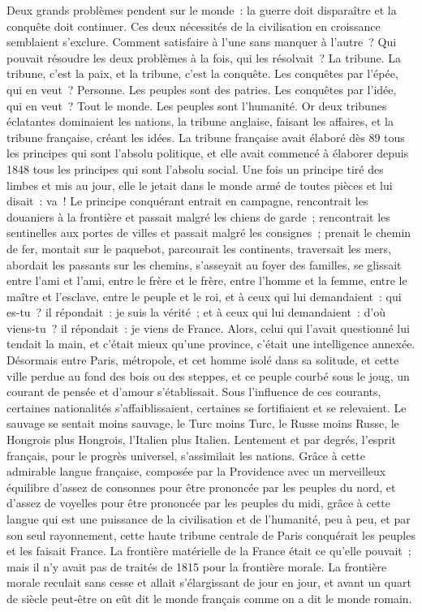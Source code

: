 \documentclass[french,twoside]{book} %
\begin{document}
\noindent Deux grands problèmes pendent sur le monde : la guerre doit disparaître et la conquête doit continuer. Ces deux nécessités de la civilisation en croissance semblaient s’exclure. Comment satisfaire à l’une sans manquer à l’autre ? Qui pouvait résoudre les deux problèmes à la fois, qui les résolvait ? La tribune. La tribune, c’est la paix, et la tribune, c’est la conquête. Les conquêtes par l’épée, qui en veut ? Personne. Les peuples sont des patries. Les conquêtes par l’idée, qui en veut ? Tout le monde. Les peuples sont l’humanité. Or deux tribunes éclatantes dominaient les nations, la tribune anglaise, faisant les affaires, et la tribune française, créant les idées. La tribune française avait élaboré dès 89 tous les principes qui sont l’absolu politique, et elle avait commencé à élaborer depuis 1848 tous les principes qui sont l’absolu social. Une fois un principe tiré des limbes et mis au jour, elle le jetait dans le monde armé de toutes pièces et lui disait : va ! Le principe conquérant entrait en campagne, rencontrait les douaniers à la frontière et passait malgré les chiens de garde ; rencontrait les sentinelles aux portes de villes et passait malgré les consignes ; prenait le chemin de fer, montait sur le paquebot, parcourait les continents, traversait les mers, abordait les passants sur les chemins, s’asseyait au foyer des familles, se glissait entre l’ami et l’ami, entre le frère et le frère, entre l’homme et la femme, entre le maître et l’esclave, entre le peuple et le roi, et à ceux qui lui demandaient : qui es-tu ? il répondait : je suis la vérité ; et à ceux qui lui demandaient : d’où viens-tu ? il répondait : je viens de France. Alors, celui qui l’avait questionné lui tendait la main, et c’était mieux qu’une province, c’était une intelligence annexée. Désormais entre Paris, métropole, et cet homme isolé dans sa solitude, et cette ville perdue au fond des bois ou des steppes, et ce peuple courbé sous le joug, un courant de pensée et d’amour s’établissait. Sous l’influence de ces courants, certaines nationalités s’affaiblissaient, certaines se fortifiaient et se relevaient. Le sauvage se sentait moins sauvage, le Turc moins Turc, le Russe moins Russe, le Hongrois plus Hongrois, l’Italien plus Italien. Lentement et par degrés, l’esprit français, pour le progrès universel, s’assimilait les nations. Grâce à cette admirable langue française, composée par la Providence avec un merveilleux équilibre d’assez de consonnes pour être prononcée par les peuples du nord, et d’assez de voyelles pour être prononcée par les peuples du midi, grâce à cette langue qui est une puissance de la civilisation et de l’humanité, peu à peu, et par son seul rayonnement, cette haute tribune centrale de Paris conquérait les peuples et les faisait France. La frontière matérielle de la France était ce qu’elle pouvait ; mais il n’y avait pas de traités de 1815 pour la frontière morale. La frontière morale reculait sans cesse et allait s’élargissant de jour en jour, et avant un quart de siècle peut-être on eût dit le monde français comme on a dit le monde romain.\par
\end{document}
